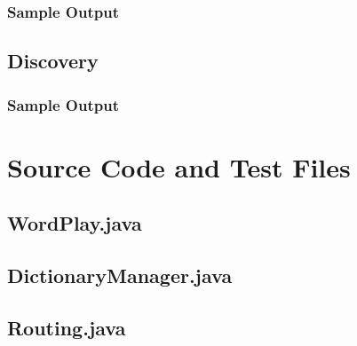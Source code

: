 \documentclass[final,a4paper,twoside,12pt]{report}
\begin{document}
\subsubsection{Sample Output}
\subsection{Discovery}
\subsubsection{Sample Output}

\section{Source Code and Test Files}
\subsection{WordPlay.java}

\subsection{DictionaryManager.java}

\subsection{Routing.java}

\end{document}
